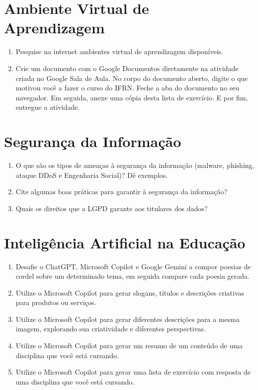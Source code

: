 \documentclass[11pt]{article}
\begin{document}
\section{Ambiente Virtual de Aprendizagem}

	\begin{enumerate}
		\item Pesquise na internet ambientes virtual de aprendizagem disponíveis.
		\item Crie um documento com o Google Documentos diretamente na atividade criada no Google Sala de Aula. No corpo do documento aberto, digite o que motivou você a fazer o curso do IFRN. Feche a aba do documento no seu navegador. Em seguida, anexe uma cópia desta lista de exercício. E por fim, entregue a atividade.
	\end{enumerate}

\section{Segurança da Informação}

	\begin{enumerate}
		\item O que são os tipos de ameaças à segurança da informação (malware, phishing, ataque DDoS e Engenharia Social)? Dê exemplos.
		\item Cite algumas boas práticas para garantir à segurança da informação?
		\item Quais os direitos que a LGPD garante aos titulares dos dados?
	\end{enumerate}

\section{Inteligência Artificial na Educação}

	\begin{enumerate}
		\item Desafie o ChatGPT, Microsoft Copilot e Google Gemini a compor poesias de cordel sobre um determinado tema, em seguida compare cada poesia gerada.
		\item Utilize o Microsoft Copilot para gerar slogans, títulos e descrições criativas para produtos ou serviços.
		\item Utilize o Microsoft Copilot para gerar diferentes descrições para a mesma imagem, explorando sua criatividade e diferentes perspectivas.
		\item Utilize o Microsoft Copilot para gerar um resumo de um conteúdo de uma disciplina que você está cursando.
		\item Utilize o Microsoft Copilot para gerar uma lista de exercício com resposta de uma disciplina que você está cursando.
	\end{enumerate}
\end{document}
